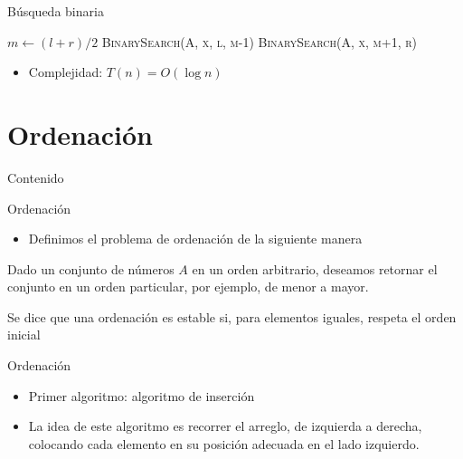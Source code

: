 \documentclass[]{beamer}
\begin{document}
\begin{frame}{B\'usqueda binaria}
  \begin{algorithm}[H]
    \BlankLine
    $m \leftarrow (l+r)/2$
    \BlankLine
    {
      \textsc{BinarySearch(A, x, l, m-1)}
    }
    {
      \textsc{BinarySearch(A, x, m+1, r)}
    }
    {
    }
  \end{algorithm}
  \pause
  \begin{itemize}
    \item Complejidad: \pause $T(n)=O(\log n)$
  \end{itemize}
\end{frame}

\section{Ordenaci\'on}
\begin{frame}{Contenido}
\tableofcontents[currentsection]
\end{frame}

\begin{frame}{Ordenaci\'on}
  \begin{itemize}
    \item Definimos el problema de ordenaci\'on de la siguiente manera
  \end{itemize}
  \begin{definition}
    Dado un conjunto de n\'umeros $A$ en un orden arbitrario, deseamos retornar
    el conjunto en un orden particular, por ejemplo, de menor a mayor.
  \end{definition}

  \begin{definition}
    Se dice que una ordenaci\'on es estable si, para elementos iguales, respeta el orden inicial
  \end{definition}
\end{frame}

\begin{frame}{Ordenaci\'on}
  \begin{itemize}
    \item Primer algoritmo: algoritmo de inserci\'on
      \pause
    \item La idea de este algoritmo es recorrer el arreglo, de izquierda a
      derecha, colocando cada elemento en su posici\'on adecuada en el lado
      izquierdo.
  \end{itemize}
\end{frame}
\end{document}
